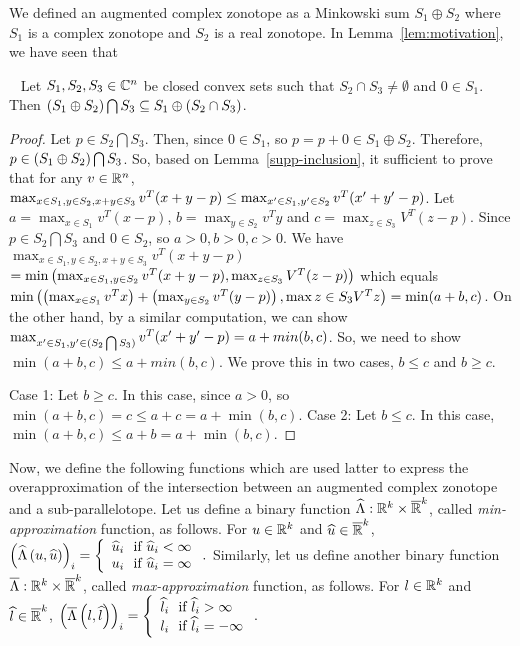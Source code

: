 We defined an augmented complex zonotope as a Minkowski sum $S_1\oplus
S_2$ where $S_1$ is a complex zonotope and $S_2$ is a real zonotope.
In Lemma~\ref{lem:motivation}, we have seen that 

%
\begin{lemma}~\label{gen-inc}
Let $S_1,S_2,S_3\in\mathbb{C}^n$ be closed convex sets such that
$S_2\cap S_3\neq \emptyset$ and $0\in S_1$.  Then $\left(S_1\oplus S_2\right)\bigcap
S_3\subseteq S_1\oplus\left(S_2\cap S_3\right)$.
\end{lemma}
\begin{proof}
 Let $p\in S_2\bigcap S_3$.
Then, since $0\in S_1$, so $p=p+0\in S_1\oplus S_2$.  Therefore, $p\in
\left(S_1\oplus S_2\right)\bigcap S_3$.  So, based on
Lemma~\ref{supp-inclusion}, it sufficient to prove that for any
$v\in\mathbb{R}^n$, $\max_{x\in S_1,y\in S_2,x+y\in S_3}v^T(x+y-p) \leq
\max_{x^\prime\in S_1,y^\prime\in S_2}v^T(x^\prime+y^\prime-p)$.  Let $a =
\max_{x\in S_1}v^T(x-p)$, $b=\max_{y\in S_2}v^Ty$ and $c = \max_{z\in
  S_3}V^T(z-p)$.  Since $p\in S_2\bigcap S_3$ and $0\in S_2$, so
$a>0,b>0,c>0$.  We have $\max_{x\in S_1,y\in S_2,x+y\in S_3}v^T(x+y-p)$
$= \min\left(\max_{x\in S_1,y\in S_2}v^T(x+y-p),\max_{z\in
  S_3}V^T(z-p)\right)$ which equals\\ $\min\left(\left(\max_{x\in
  S_1}v^Tx\right)+\left(\max_{y\in S_2}v^T(y-p)\right),\max{z\in S_3}V^Tz\right)
= \min(a+b,c)$.  On the other hand, by a similar computation, we can
show $\max_{x^\prime\in S_1,y^\prime\in (S_2\bigcap S_3)}v^T(x^\prime+y^\prime-p)
= a+min(b,c)$.  So, we need to show $\min(a+b,c)\leq a+min(b,c)$.  We
prove this in two cases, $b\leq c$ and $b\geq c$.


Case 1: Let $b\geq c$.  In this case, since $a>0$, so
$\min(a+b,c) = c \leq a+c = a+\min(b,c)$.
Case 2: Let $b\leq c$.  In this case, $\min(a+b,c)\leq a+b = a+\min(b,c)$.
\end{proof}

Now, we define the following functions which are used latter to
express the overapproximation of the intersection between an augmented
complex zonotope and a sub-parallelotope.
%
Let us define a binary function
$\widehat{\Lambda}:\mathbb{R}^k\times\mathbb{\overline{R}}^k$,
called \emph{min-approximation} function, as follows.  For
$u\in\mathbb{R}^k$ and $\widehat{u}\in\mathbb{\overline{R}}^k$,
$\left(\widehat{\Lambda}\left(u,\widehat{u}\right)\right)_i = \left\{
\begin{array}{l}
\widehat{u}_i~~\text{if}~\widehat{u}_i<\infty\\
u_i~~\text{if}~\widehat{u}_i=\infty
\end{array}
\right..$
Similarly, let us define another binary function       
$\overline{\Lambda}:\mathbb{R}^k\times\mathbb{\overline{R}}^k$,
called \emph{max-approximation} function, as follows.  For
$l\in\mathbb{R}^k$ and $\widehat{l}\in\mathbb{\overline{R}}^k$,
$\left(\overline{\Lambda}\left(l,\widehat{l}\right)\right)_i = \left\{
\begin{array}{l}
\widehat{l}_i~~\text{if}~\widehat{l}_i>\infty\\
l_i~~\text{if}~\widehat{l}_i=-\infty
\end{array}
\right..$
%

